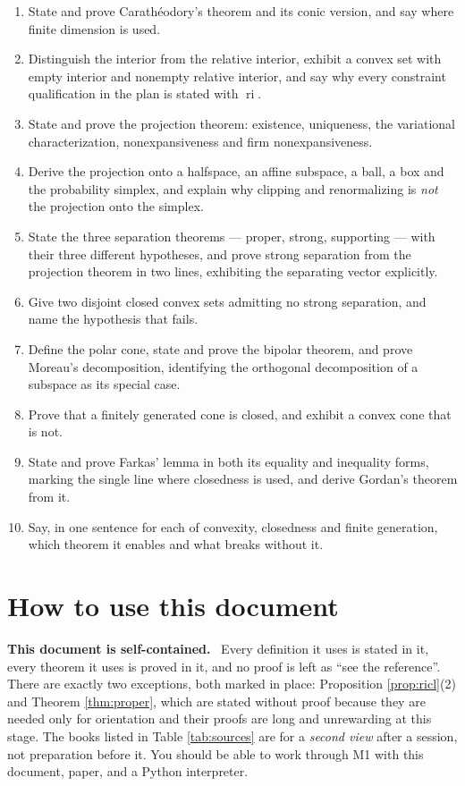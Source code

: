 \documentclass[11pt,a4paper]{article}
\newcommand{\mpart}[1]{\smallskip\noindent\textbf{#1}\ \ignorespaces}
\theoremstyle{definition}
\theoremstyle{plain}
\theoremstyle{remark}
\DeclareMathOperator{\ri}{ri}
\begin{document}
\begin{enumerate}
\item State and prove Carath\'eodory's theorem and its conic version, and say where finite
dimension is used.
\item Distinguish the interior from the relative interior, exhibit a convex set with empty
interior and nonempty relative interior, and say why every constraint qualification in the
plan is stated with $\ri$.
\item State and prove the projection theorem: existence, uniqueness, the variational
characterization, nonexpansiveness and firm nonexpansiveness.
\item Derive the projection onto a halfspace, an affine subspace, a ball, a box and the
probability simplex, and explain why clipping and renormalizing is \emph{not} the projection
onto the simplex.
\item State the three separation theorems --- proper, strong, supporting --- with their three
different hypotheses, and prove strong separation from the projection theorem in two lines,
exhibiting the separating vector explicitly.
\item Give two disjoint closed convex sets admitting no strong separation, and name the
hypothesis that fails.
\item Define the polar cone, state and prove the bipolar theorem, and prove Moreau's
decomposition, identifying the orthogonal decomposition of a subspace as its special case.
\item Prove that a finitely generated cone is closed, and exhibit a convex cone that is not.
\item State and prove Farkas' lemma in both its equality and inequality forms, marking the
single line where closedness is used, and derive Gordan's theorem from it.
\item Say, in one sentence for each of convexity, closedness and finite generation, which
theorem it enables and what breaks without it.
\end{enumerate}

\section{How to use this document}

\mpart{This document is self-contained.} Every definition it uses is stated in it, every
theorem it uses is proved in it, and no proof is left as ``see the reference''. There are
exactly two exceptions, both marked in place: Proposition \ref{prop:ricl}(2) and Theorem
\ref{thm:proper}, which are stated without proof because they are needed only for orientation
and their proofs are long and unrewarding at this stage. The books listed in
Table \ref{tab:sources} are for a \emph{second view} after a session, not preparation before
it. You should be able to work through M1 with this document, paper, and a Python interpreter.
\end{document}
